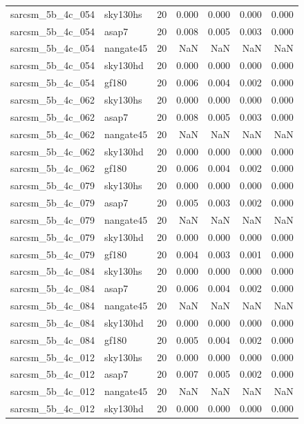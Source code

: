 \begin{tabular}{llrrrrr}
sarcsm\_5b\_4c\_054 & sky130hs & 20 & 0.000 & 0.000 & 0.000 & 0.000 \\
sarcsm\_5b\_4c\_054 & asap7 & 20 & 0.008 & 0.005 & 0.003 & 0.000 \\
sarcsm\_5b\_4c\_054 & nangate45 & 20 & NaN & NaN & NaN & NaN \\
sarcsm\_5b\_4c\_054 & sky130hd & 20 & 0.000 & 0.000 & 0.000 & 0.000 \\
sarcsm\_5b\_4c\_054 & gf180 & 20 & 0.006 & 0.004 & 0.002 & 0.000 \\
sarcsm\_5b\_4c\_062 & sky130hs & 20 & 0.000 & 0.000 & 0.000 & 0.000 \\
sarcsm\_5b\_4c\_062 & asap7 & 20 & 0.008 & 0.005 & 0.003 & 0.000 \\
sarcsm\_5b\_4c\_062 & nangate45 & 20 & NaN & NaN & NaN & NaN \\
sarcsm\_5b\_4c\_062 & sky130hd & 20 & 0.000 & 0.000 & 0.000 & 0.000 \\
sarcsm\_5b\_4c\_062 & gf180 & 20 & 0.006 & 0.004 & 0.002 & 0.000 \\
sarcsm\_5b\_4c\_079 & sky130hs & 20 & 0.000 & 0.000 & 0.000 & 0.000 \\
sarcsm\_5b\_4c\_079 & asap7 & 20 & 0.005 & 0.003 & 0.002 & 0.000 \\
sarcsm\_5b\_4c\_079 & nangate45 & 20 & NaN & NaN & NaN & NaN \\
sarcsm\_5b\_4c\_079 & sky130hd & 20 & 0.000 & 0.000 & 0.000 & 0.000 \\
sarcsm\_5b\_4c\_079 & gf180 & 20 & 0.004 & 0.003 & 0.001 & 0.000 \\
sarcsm\_5b\_4c\_084 & sky130hs & 20 & 0.000 & 0.000 & 0.000 & 0.000 \\
sarcsm\_5b\_4c\_084 & asap7 & 20 & 0.006 & 0.004 & 0.002 & 0.000 \\
sarcsm\_5b\_4c\_084 & nangate45 & 20 & NaN & NaN & NaN & NaN \\
sarcsm\_5b\_4c\_084 & sky130hd & 20 & 0.000 & 0.000 & 0.000 & 0.000 \\
sarcsm\_5b\_4c\_084 & gf180 & 20 & 0.005 & 0.004 & 0.002 & 0.000 \\
sarcsm\_5b\_4c\_012 & sky130hs & 20 & 0.000 & 0.000 & 0.000 & 0.000 \\
sarcsm\_5b\_4c\_012 & asap7 & 20 & 0.007 & 0.005 & 0.002 & 0.000 \\
sarcsm\_5b\_4c\_012 & nangate45 & 20 & NaN & NaN & NaN & NaN \\
sarcsm\_5b\_4c\_012 & sky130hd & 20 & 0.000 & 0.000 & 0.000 & 0.000 \\

\end{tabular}
